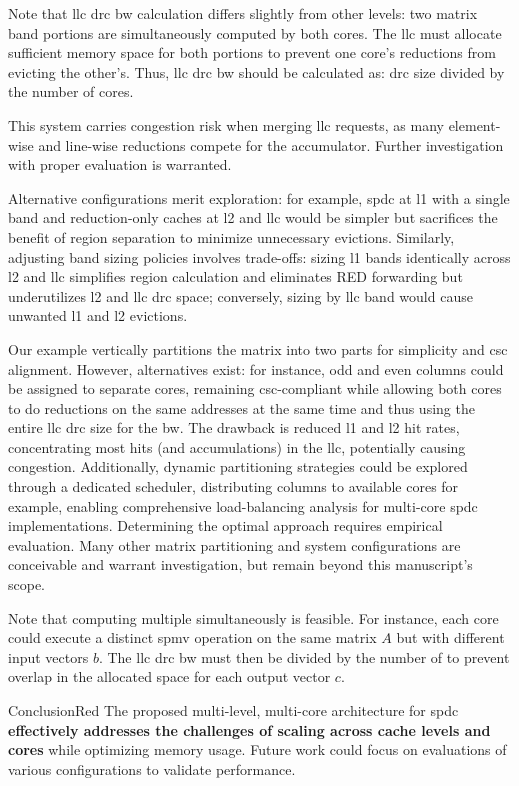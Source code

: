 Note that \acrshort{llc} \acrshort{drc} \gls{bw} calculation differs slightly from other levels: two matrix \gls{band} portions are simultaneously computed by both cores.
The \acrshort{llc} must allocate sufficient memory space for both portions to prevent one core's \glspl{reduction} from evicting the other's.
Thus, \acrshort{llc} \acrshort{drc} \gls{bw} should be calculated as: \acrshort{drc} size divided by the number of cores.

This system carries congestion risk when merging \acrshort{llc} requests, as many element-wise and line-wise \glspl{reduction} compete for the accumulator.
Further investigation with proper evaluation is warranted.

Alternative configurations merit exploration: for example, \acrlong{spdc} at \acrshort{l1} with a single \gls{band} and \gls{reduction}-only caches at \acrshort{l2} and \acrshort{llc} would be simpler but sacrifices the benefit of region separation to minimize unnecessary \glspl{eviction}.
Similarly, adjusting \gls{band} sizing policies involves trade-offs: sizing \acrshort{l1} \gls{band}s identically across \acrshort{l2} and \acrshort{llc} simplifies region calculation and eliminates RED forwarding but underutilizes \acrshort{l2} and \acrshort{llc} \acrshort{drc} space; conversely, sizing by \acrshort{llc} \gls{band} would cause unwanted \acrshort{l1} and \acrshort{l2} \glspl{eviction}.

Our example vertically partitions the matrix into two parts for simplicity and \acrshort{csc} alignment.
However, alternatives exist: for instance, odd and even columns could be assigned to separate cores, remaining \acrshort{csc}-compliant while allowing both cores to do \glspl{reduction} on the same addresses at the same time and thus using the entire \acrshort{llc} \acrshort{drc} size for the \gls{bw}.
The drawback is reduced \acrshort{l1} and \acrshort{l2} \gls{hit} rates, concentrating most \glspl{hit} (and accumulations) in the \acrshort{llc}, potentially causing congestion.
Additionally, dynamic partitioning strategies could be explored through a dedicated scheduler, distributing columns to available cores for example, enabling comprehensive load-balancing analysis for multi-core \acrlong{spdc} implementations.
Determining the optimal approach requires empirical evaluation.
Many other matrix partitioning and system configurations are conceivable and warrant investigation, but remain beyond this manuscript's scope.

Note that computing multiple  simultaneously is feasible.
For instance, each core could execute a distinct \acrshort{spmv} operation on the same matrix $A$ but with different input vectors $b$.
The \acrshort{llc} \acrshort{drc} \gls{bw} must then be divided by the number of  to prevent overlap in the allocated space for each output vector $c$.

\begin{highlight}{Conclusion}{Red}
    The proposed multi-level, multi-core architecture for \acrlong{spdc} \textbf{effectively addresses the challenges of scaling across cache levels and cores} while optimizing memory usage.
    Future work could focus on evaluations of various configurations to validate performance.
\end{highlight}